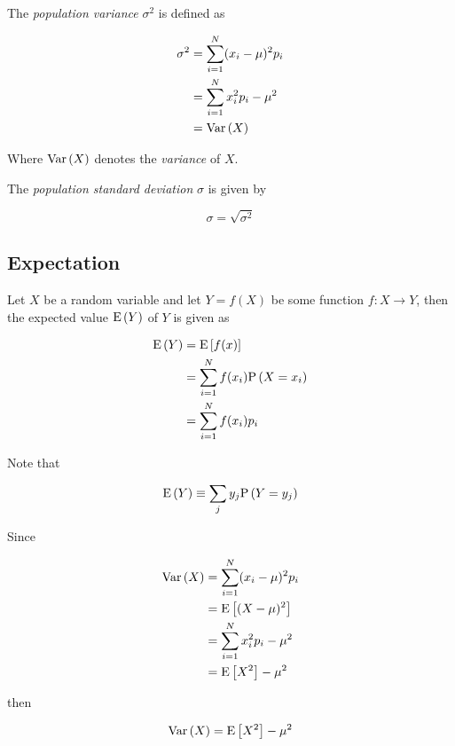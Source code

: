 \begin{definition}
    The \textit{population variance} $\sigma^2$ is defined as

    \begin{align}
        \sigma^2
        &= \sum \limits_{i=1}^{N} (x_i - \mu)^2 p_i \\
        &= \sum \limits_{i=1}^{N} x_i^2 p_i - \mu^2 \\
        &= \mathrm{Var} \left( X \right)
    \end{align}

    Where $\mathrm{Var} \left( X \right)$ denotes the \textit{variance} of $X$.
\end{definition}

\begin{definition}
    The \textit{population standard deviation} $\sigma$ is given by

    \begin{equation}
        \sigma = \sqrt{\sigma^2}
    \end{equation}
\end{definition}

\subsection{Expectation}

\begin{definition}
    Let $X$ be a random variable and let $Y = f(X)$ be some function
    $f \colon X \to Y$, then the expected value $\mathrm{E} \left( Y \right)$ of $Y$ is given as

    \begin{align}
        \mathrm{E} \left( Y \right)
        &= \mathrm{E} \left[ f(x) \right] \\
        &= \sum \limits_{i=1}^{N} f(x_i) \mathrm{P} \left( X = x_i \right) \\
        &= \sum \limits_{i=1}^{N} f(x_i) p_i
    \end{align}

    Note that

    \begin{equation}
        \mathrm{E} \left( Y \right) \equiv \sum_j y_j \mathrm{P} \left( Y = y_j \right)
    \end{equation}
\end{definition}

\begin{definition}[Variance]
    Since

    \begin{align*}
        \mathrm{Var} \left( X \right)
        &= \sum \limits_{i=1}^{N} (x_i - \mu)^2 p_i \\
        &= \mathrm{E} \left[ (X - \mu)^2 \right] \\
        &= \sum \limits_{i=1}^{N} x_i^2 p_i - \mu^2 \\
        &= \mathrm{E} \left[ X^2 \right] - \mu^2
    \end{align*}

    then

    \begin{equation}
        \mathrm{Var} \left( X \right) = \mathrm{E} \left[ X^2 \right] - \mu^2
    \end{equation}
\end{definition}

